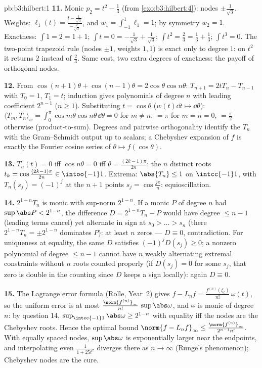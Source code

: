 \begin{solution}{pb:b3:hilbert:1}
\textbf{11.} Monic $p_2 = t^2 - \frac13$ (from
\cref{exo:b3:hilbert:4}): nodes $\pm\frac1{\sqrt3}$. Weights:
$\ell_1(t) = \frac{t - \frac1{\sqrt3}}{-\frac2{\sqrt3}}$, and
$w_1 = \int_{-1}^1\ell_1 = 1$; by symmetry $w_2 = 1$.
Exactness: $\int 1 = 2 = 1 + 1$; $\int t = 0 =
-\frac1{\sqrt3} + \frac1{\sqrt3}$; $\int t^2 = \frac23 =
\frac13 + \frac13$; $\int t^3 = 0$. The two-point trapezoid
rule (nodes $\pm1$, weights $1, 1$) is exact only to degree
$1$: on $t^2$ it returns $2$ instead of $\frac23$. Same cost,
two extra degrees of exactness: the payoff of orthogonal
nodes.

\textbf{12.} From $\cos(n{+}1)\theta + \cos(n{-}1)\theta =
2\cos\theta\cos n\theta$: $T_{n+1} = 2tT_n - T_{n-1}$ with
$T_0 = 1$, $T_1 = t$; induction gives polynomials of degree
$n$ with leading coefficient $2^{n-1}$ ($n \geq 1$).
Substituting $t = \cos\theta$ ($w(t)\dd t \mapsto
\dd\theta$): $\langle T_m, T_n\rangle_w =
\int_0^\pi\cos m\theta\cos n\theta\,\dd\theta = 0$ for $m
\neq n$, $= \pi$ for $m = n = 0$, $= \frac\pi2$ otherwise
(product-to-sum). Degrees and pairwise orthogonality
identify the $T_n$ with the Gram--Schmidt output up to
scalars; a Chebyshev expansion of $f$ is exactly the
Fourier cosine series of $\theta \mapsto f(\cos\theta)$.

\textbf{13.} $T_n(t) = 0$ iff $\cos n\theta = 0$ iff
$\theta = \frac{(2k-1)\pi}{2n}$: the $n$ distinct roots
$t_k = \cos\frac{(2k-1)\pi}{2n} \in \intoo{-1}1$. Extrema:
$\abs{T_n} \leq 1$ on $\intcc{-1}1$, with $T_n(s_j) =
(-1)^j$ at the $n + 1$ points $s_j = \cos\frac{j\pi}n$:
 equioscillation.

\textbf{14.} $2^{1-n}T_n$ is monic with sup-norm $2^{1-n}$.
If a monic $P$ of degree $n$ had $\sup\abs P < 2^{1-n}$, the
difference $D = 2^{1-n}T_n - P$ would have degree $\leq n -
1$ (leading terms cancel) yet alternate in sign at $s_0 >
\dots > s_n$ (there $2^{1-n}T_n = \pm2^{1-n}$ dominates
$P$): at least $n$ zeros --- $D \equiv 0$, contradiction.
For uniqueness at equality, the same $D$ satisfies
$(-1)^jD(s_j) \geq 0$; a nonzero polynomial of degree $\leq
n-1$ cannot have $n$ weakly alternating extremal
constraints without $n$ roots counted properly (if
$D(s_j) = 0$ for some  $s_j$, that zero is double
in the counting since $D$ keeps a sign locally): again $D
\equiv 0$.

\textbf{15.} The Lagrange error formula (Rolle, Year~2)
gives $f - L_nf = \frac{f^{(n)}(\xi_t)}{n!}\,\omega(t)$, so
the uniform error is at most $\frac{\norm{f^{(n)}}_\infty}
{n!}\,\sup\abs\omega$, and $\omega$ is monic of degree $n$:
by question 14, $\sup_{\intcc{-1}1}\abs\omega \geq 2^{1-n}$
with equality iff the nodes are the Chebyshev roots. Hence
the optimal bound $\norm{f - L_nf}_\infty \leq
\frac{\norm{f^{(n)}}_\infty}{2^{n-1}n!}$. With equally
spaced nodes, $\sup\abs\omega$ is exponentially larger near
the endpoints, and interpolating even $\frac1{1 + 25t^2}$
diverges there as $n \to \infty$ (Runge's phenomenon);
Chebyshev nodes are the cure.


\end{solution}
